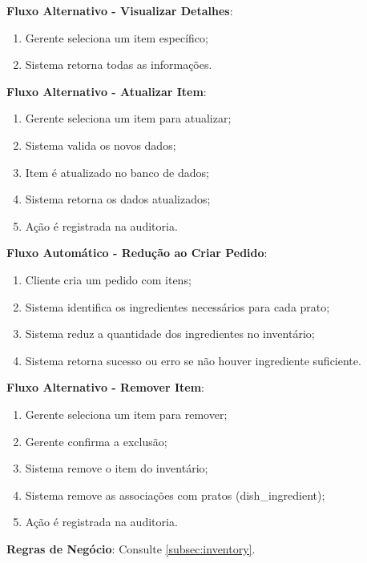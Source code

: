 \begin{itemize}[topsep=1pt, itemsep=0pt]
  \textbf{Fluxo Alternativo - Visualizar Detalhes}:
  \begin{enumerate}
    \item Gerente seleciona um item específico;
    \item Sistema retorna todas as informações.
  \end{enumerate}

  \textbf{Fluxo Alternativo - Atualizar Item}:
  \begin{enumerate}
    \item Gerente seleciona um item para atualizar;
    \item Sistema valida os novos dados;
    \item Item é atualizado no banco de dados;
    \item Sistema retorna os dados atualizados;
    \item Ação é registrada na auditoria.
  \end{enumerate}

  \textbf{Fluxo Automático - Redução ao Criar Pedido}:
  \begin{enumerate}
    \item Cliente cria um pedido com itens;
    \item Sistema identifica os ingredientes necessários para cada prato;
    \item Sistema reduz a quantidade dos ingredientes no inventário;
    \item Sistema retorna sucesso ou erro se não houver ingrediente suficiente.
  \end{enumerate}

  \textbf{Fluxo Alternativo - Remover Item}:
  \begin{enumerate}
    \item Gerente seleciona um item para remover;
    \item Gerente confirma a exclusão;
    \item Sistema remove o item do inventário;
    \item Sistema remove as associações com pratos (dish\_ingredient);
    \item Ação é registrada na auditoria.
  \end{enumerate}

  \textbf{Regras de Negócio}:
  Consulte \ref{subsec:inventory}.

\end{itemize}

